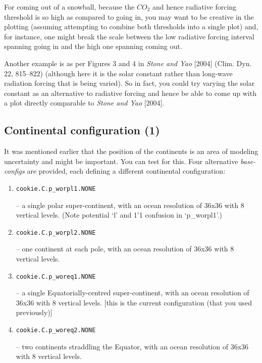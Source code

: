 For coming out of a snowball, because the \(CO_{2}\) and hence radiative forcing threshold is so high as compared to going in, you may want to be creative in the plotting (assuming attempting to combine both thresholds into a single plot) and, for instance, one might break the scale between the low radiative forcing interval spanning going in and the high one spanning coming out.

Another example is as per Figures 3 and 4 in \textit{Stone and Yao} [2004] (Clim. Dyn. 22, 815–822) (although here it is the solar constant rather than long-wave radiation forcing that is being varied). So in fact, you could try varying the solar constant as an alternative to radiative forcing and hence be able to come up with a plot directly comparable to \textit{Stone and Yao} [2004].


\subsection{Continental configuration (1)}

It was mentioned earlier that the position of the continents is an area of modeling uncertainty and might be important. You can test for this. Four alternative \textit{base-configs} are provided, each defining a different continental configuration:

\vspace{1mm}
\begin{enumerate}[noitemsep]
\setlength{\itemindent}{.2in}
\item
\begin{verbatim}
cookie.C.p_worpl1.NONE
\end{verbatim}
 – a single polar super-continent, with an ocean resolution of 36x36 with 8 vertical levels. (Note potential ‘l’ and 1’1 confusion in ‘\textsf{\footnotesize p\_worpl1}’.)
\item
\begin{verbatim}
cookie.C.p_worpl2.NONE
\end{verbatim}
  – one continent at each pole, with an ocean resolution of 36x36 with 8 vertical levels.
\item
\begin{verbatim}
cookie.C.p_woreq1.NONE
\end{verbatim}
  – a single Equatorially-centred super-continent, with an ocean resolution of 36x36 with 8 vertical levels. [this is the current configuration (that you  used previously)]
\item
\begin{verbatim}
cookie.C.p_woreq2.NONE
\end{verbatim}
 – two continents straddling the Equator, with an ocean resolution of 36x36 with 8 vertical levels.
\end{enumerate}
\vspace{1mm}

